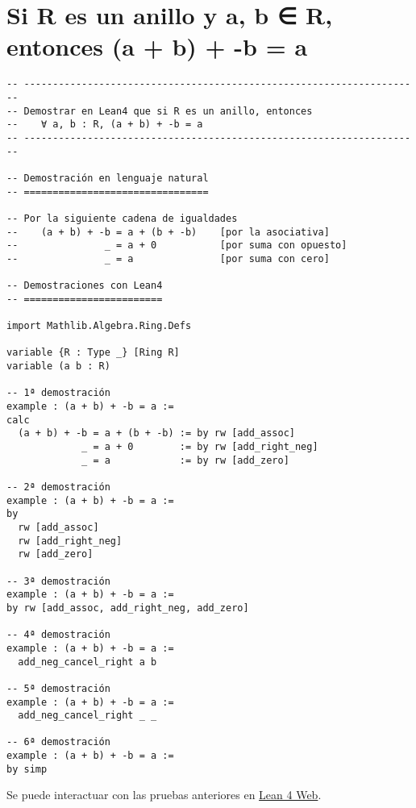 \section{Si R es un anillo y a, b ∈ R, entonces (a + b) + -b = a}
\label{sec:orgc1e6779}
\begin{verbatim}
-- ---------------------------------------------------------------------
-- Demostrar en Lean4 que si R es un anillo, entonces
--    ∀ a, b : R, (a + b) + -b = a
-- ---------------------------------------------------------------------

-- Demostración en lenguaje natural
-- ================================

-- Por la siguiente cadena de igualdades
--    (a + b) + -b = a + (b + -b)    [por la asociativa]
--               _ = a + 0           [por suma con opuesto]
--               _ = a               [por suma con cero]

-- Demostraciones con Lean4
-- ========================

import Mathlib.Algebra.Ring.Defs

variable {R : Type _} [Ring R]
variable (a b : R)

-- 1ª demostración
example : (a + b) + -b = a :=
calc
  (a + b) + -b = a + (b + -b) := by rw [add_assoc]
             _ = a + 0        := by rw [add_right_neg]
             _ = a            := by rw [add_zero]

-- 2ª demostración
example : (a + b) + -b = a :=
by
  rw [add_assoc]
  rw [add_right_neg]
  rw [add_zero]

-- 3ª demostración
example : (a + b) + -b = a :=
by rw [add_assoc, add_right_neg, add_zero]

-- 4ª demostración
example : (a + b) + -b = a :=
  add_neg_cancel_right a b

-- 5ª demostración
example : (a + b) + -b = a :=
  add_neg_cancel_right _ _

-- 6ª demostración
example : (a + b) + -b = a :=
by simp
\end{verbatim}
Se puede interactuar con las pruebas anteriores en \href{https://lean.math.hhu.de/\#url=https://raw.githubusercontent.com/jaalonso/Calculemus2/main/src/Opuesto\_se\_cancela\_con\_la\_suma\_por\_la\_derecha.lean}{Lean 4 Web}.

